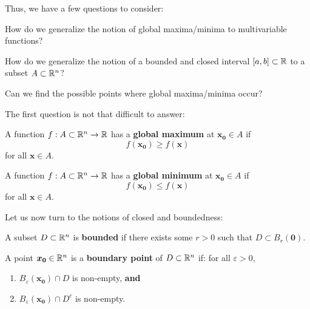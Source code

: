 Thus, we have a few questions to consider:

\begin{motivating}
        How do we generalize the notion of global maxima/minima to multivariable functions?
    \end{motivating}
    
    \begin{motivating}
How do we generalize the notion of a bounded and closed interval $[a,b] \subset \mathbb{R}$ to a subset $A \subset \mathbb{R}^n$?
\end{motivating}

\begin{motivating}
    Can we find the possible points where global maxima/minima occur?
\end{motivating}

The first question is not that difficult to answer:

\begin{definition}
    A function $f : A \subset \mathbb{R}^n \to \mathbb{R}$ has a \textbf{global maximum} at $\bm{x_0} \in A$ if
    $$f(\bm{x_0}) \geq f(\bm{x})$$ 
    for all $\bm{x} \in A$.
    \end{definition}
    
    \begin{definition}
    A function $f : A \subset \mathbb{R}^n \to \mathbb{R}$ has a \textbf{global minimum} at $\bm{x_0} \in A$ if
    $$f(\bm{x_0}) \leq f(\bm{x})$$ 
    for all $\bm{x} \in A$.
    \end{definition}

Let us now turn to the notions of closed and boundedness:

\begin{definition}
A subset $D \subset \mathbb{R}^n$ is \textbf{bounded} if there exists some $r > 0$ such that $D \subset B_r(\bm{0})$.
\end{definition}

\begin{definition}
A point $\bm{x_0} \in \mathbb{R}^n$ is a \textbf{boundary point} of $D \subset \mathbb{R}^n$ if: for all $\varepsilon > 0$,

\begin{enumerate}
    \item $B_\varepsilon(\bm{x_0}) \cap D$ is non-empty, \textbf{and}
    \item $B_\varepsilon(\bm{x_0}) \cap D^{c}$ is non-empty.
\end{enumerate}

\end{definition}

